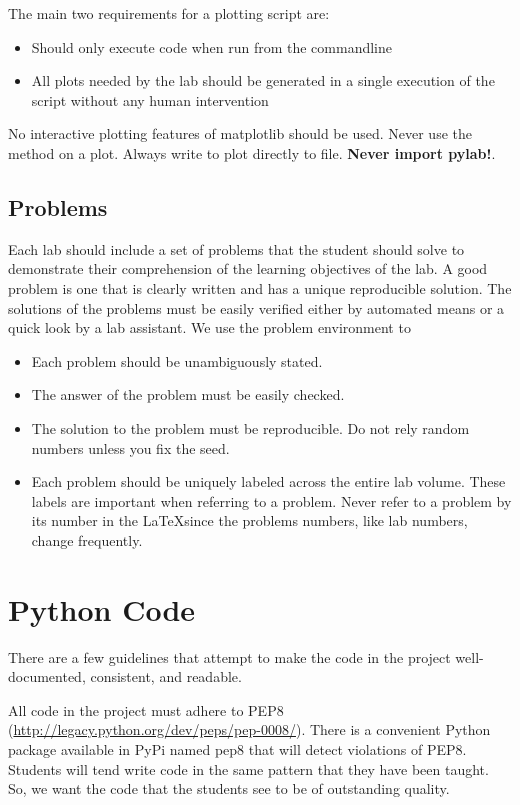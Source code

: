 The main two requirements for a plotting script are:
\begin{itemize}
\item Should only execute code when run from the commandline
\item All plots needed by the lab should be generated in a single execution of the script without any human intervention
\end{itemize}

No interactive plotting features of matplotlib should be used.  
Never use the  method on a plot.  
Always write to plot directly to file.
\textbf{Never import pylab!}.

\subsection{Problems}
Each lab should include a set of problems that the student should solve to demonstrate their comprehension of the learning objectives of the lab.
A good problem is one that is clearly written and has a unique reproducible solution.
The solutions of the problems must be easily verified either by automated means or a quick look by a lab assistant.
We use the problem environment to 
\begin{itemize}
\item Each problem should be unambiguously stated.
\item The answer of the problem must be easily checked.
\item The solution to the problem must be reproducible.
Do not rely random numbers unless you fix the seed.
\item Each problem should be uniquely labeled across the entire lab volume.
These labels are important when referring to a problem.
Never refer to a problem by its number in the \LaTeX since the problems numbers, like lab numbers, change frequently.
\end{itemize}

\section{Python Code}
There are a few guidelines that attempt to make the code in the project well-documented, consistent, and readable.

All code in the project must adhere to PEP8 (\url{http://legacy.python.org/dev/peps/pep-0008/}).
There is a convenient Python package available in PyPi named pep8 that will detect violations of PEP8.
Students will tend write code in the same pattern that they have been taught.
So, we want the code that the students see to be of outstanding quality.

